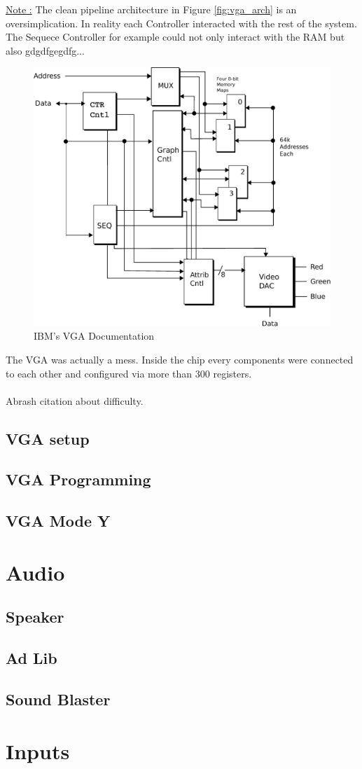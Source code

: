 \documentclass[book.tex]{subfiles}
\begin{document}
 {\underline{Note :}} The clean pipeline architecture in Figure \ref{fig:vga_arch} is an oversimplication. In reality each Controller interacted with the rest of the system. The Sequece Controller for example could not only interact with the RAM but also gdgdfgegdfg...

\begin{figure}[H]
\centering
\includegraphics[scale=0.38]{imgs/ibm_vga.eps}
%
\caption{IBM's VGA Documentation}
\label{fig:ibm_vga}
\end{figure}

The VGA was actually a mess. Inside the chip every components were connected to each other and configured via more than 300 registers.\\
\\
Abrash citation about difficulty.
 
 
  \subsection{VGA setup}

  \subsection{VGA Programming}
  \subsection{VGA Mode Y}
\section{Audio}
  \subsection{Speaker}
  \subsection{Ad Lib}
  \subsection{Sound Blaster}

\section{Inputs}
\end{document}
